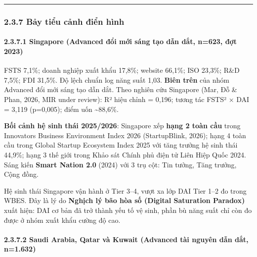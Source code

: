 \documentclass[12pt,a4paper]{article}
\begin{document}
\begin{center}\rule{0.5\linewidth}{0.5pt}\end{center}

\hypertarget{237-bux1ea3y-tiux1ec3u-cux1ea3nh-ux111iux1ec3n-huxecnh}{%
\subsubsection{2.3.7 Bảy tiểu cảnh điển
hình}\label{237-bux1ea3y-tiux1ec3u-cux1ea3nh-ux111iux1ec3n-huxecnh}}

\hypertarget{2371-singapore-advanced-ux111ux1ed5i-mux1edbi-suxe1ng-tux1ea1o-dux1eabn-dux1eaft-n623-ux111ux1ee3t-2023}{%
\paragraph{2.3.7.1 Singapore (Advanced đổi mới sáng tạo dẫn dắt, n=623,
đợt
2023)}\label{2371-singapore-advanced-ux111ux1ed5i-mux1edbi-suxe1ng-tux1ea1o-dux1eabn-dux1eaft-n623-ux111ux1ee3t-2023}}

FSTS 7,1\%; doanh nghiệp xuất khẩu 17,8\%; website 66,1\%; ISO 23,3\%;
R\&D 7,5\%; FDI 31,5\%. Độ lệch chuẩn log năng suất 1,03. \textbf{Biên
trên} của nhóm Advanced đổi mới sáng tạo dẫn dắt. Theo nghiên cứu
Singapore (Mar, Đỗ \& Phan, 2026, MIR under review): R² hiệu chỉnh =
0,196; tương tác FSTS² × DAI = 3,119 (p=0,005); điểm uốn
\textasciitilde88,6\%.

\textbf{Bối cảnh hệ sinh thái 2025/2026}: Singapore xếp \textbf{hạng 2
toàn cầu} trong Innovators Business Environment Index 2026
(StartupBlink, 2026); hạng 4 toàn cầu trong Global Startup Ecosystem
Index 2025 với tăng trưởng hệ sinh thái 44,9\%; hạng 3 thế giới trong
Khảo sát Chính phủ điện tử Liên Hiệp Quốc 2024. Sáng kiến \textbf{Smart
Nation 2.0} (2024) với 3 trụ cột: Tin tưởng, Tăng trưởng, Cộng đồng.

Hệ sinh thái Singapore vận hành ở Tier 3--4, vượt xa lớp DAI Tier 1--2
đo trong WBES. Đây là lý do \textbf{Nghịch lý bão hòa số (Digital
Saturation Paradox)} xuất hiện: DAI cơ bản đã trở thành yếu tố vệ sinh,
phần bù năng suất chỉ còn đo được ở nhóm xuất khẩu cường độ cao.

\hypertarget{2372-saudi-arabia-qatar-vuxe0-kuwait-advanced-tuxe0i-nguyuxean-dux1eabn-dux1eaft-n1632}{%
\paragraph{2.3.7.2 Saudi Arabia, Qatar và Kuwait (Advanced tài nguyên
dẫn dắt,
n=1.632)}\label{2372-saudi-arabia-qatar-vuxe0-kuwait-advanced-tuxe0i-nguyuxean-dux1eabn-dux1eaft-n1632}}
\end{document}
